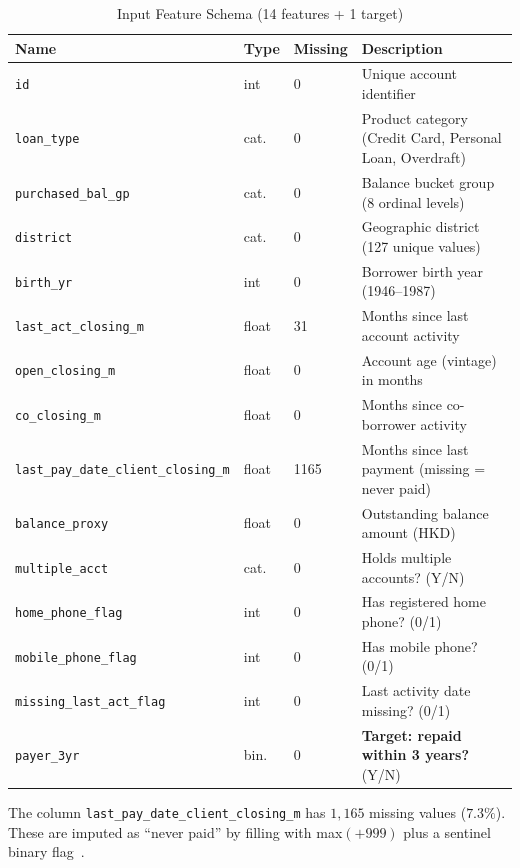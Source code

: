 \documentclass[12pt, a4paper]{article}
\begin{document}
\begin{table}[H]
\centering
\caption{Input Feature Schema (14 features + 1 target)}
\label{tab:schema}
\small
\begin{tabular}{@{}lllp{5.5cm}@{}}
\toprule
\textbf{Name} & \textbf{Type} & \textbf{Missing} & \textbf{Description}\\
\midrule
\texttt{id}              & int    & 0     & Unique account identifier\\
\texttt{loan\_type}       & cat.   & 0     & Product category (Credit Card, Personal Loan, Overdraft)\\
\texttt{purchased\_bal\_gp}& cat.  & 0     & Balance bucket group (8 ordinal levels)\\
\texttt{district}         & cat.   & 0     & Geographic district (127 unique values)\\
\texttt{birth\_yr}        & int    & 0     & Borrower birth year (1946--1987)\\
\texttt{last\_act\_closing\_m} & float & 31  & Months since last account activity\\
\texttt{open\_closing\_m} & float & 0     & Account age (vintage) in months\\
\texttt{co\_closing\_m}   & float & 0     & Months since co-borrower activity\\
\texttt{last\_pay\_date\_client\_closing\_m} & float & 1165 & Months since last payment (missing = never paid)\\
\texttt{balance\_proxy}   & float & 0     & Outstanding balance amount (HKD)\\
\texttt{multiple\_acct}   & cat.   & 0     & Holds multiple accounts? (Y/N)\\
\texttt{home\_phone\_flag}& int    & 0     & Has registered home phone? (0/1)\\
\texttt{mobile\_phone\_flag}& int   & 0     & Has mobile phone? (0/1)\\
\texttt{missing\_last\_act\_flag} & int & 0 & Last activity date missing? (0/1)\\
\midrule
\texttt{payer\_3yr}       & bin.   & 0     & \textbf{Target: repaid within 3 years?} (Y/N)\\
\bottomrule
\end{tabular}
\end{table}

The column \texttt{last\_pay\_date\_client\_closing\_m} has $1{,}165$ missing values ($7.3\%$). These are imputed as ``never paid'' by filling with max$(+999)$ plus a sentinel binary flag~\cite{little2002}.
\end{document}
